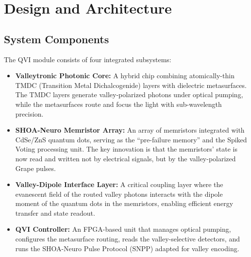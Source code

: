 \documentclass[12pt]{article}
\begin{document}
\section{Design and Architecture}
\subsection{System Components}
The QVI module consists of four integrated subsystems:
\begin{itemize}
    \item \textbf{Valleytronic Photonic Core:} A hybrid chip combining atomically-thin TMDC (Transition Metal Dichalcogenide) layers with dielectric metasurfaces. The TMDC layers generate valley-polarized photons under optical pumping, while the metasurfaces route and focus the light with sub-wavelength precision.
    \item \textbf{SHOA-Neuro Memristor Array:} An array of memristors integrated with CdSe/ZnS quantum dots, serving as the ``pre-failure memory'' and the Spiked Voting processing unit. The key innovation is that the memristors' state is now read and written not by electrical signals, but by the valley-polarized Grape pulses.
    \item \textbf{Valley-Dipole Interface Layer:} A critical coupling layer where the evanescent field of the routed valley photons interacts with the dipole moment of the quantum dots in the memristors, enabling efficient energy transfer and state readout.
    \item \textbf{QVI Controller:} An FPGA-based unit that manages optical pumping, configures the metasurface routing, reads the valley-selective detectors, and runs the SHOA-Neuro Pulse Protocol (SNPP) adapted for valley encoding.
\end{itemize}
\end{document}
